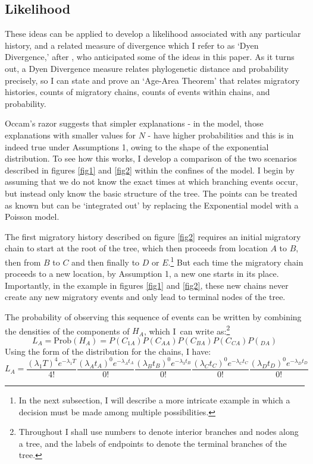 \documentclass[11pt]{article}
\begin{document}
\subsection{Likelihood}

These ideas can be applied to develop a likelihood associated with any particular history, and a related measure of divergence which I refer to as `Dyen Divergence,' after \cite{dyen56}, who anticipated some of the ideas in this paper. As it turns out, a Dyen Divergence measure relates phylogenetic distance and probability precisely, so I  can state and prove an `Age-Area Theorem' that relates  migratory histories, counts of migratory chains, counts of events within chains, and probability. 

Occam's razor suggests that simpler explanations - in the model, those explanations with smaller values for $N$ - have higher probabilities and this is in indeed true under Assumptions 1, owing to the shape of the exponential distribution. To see how this works,  I  develop a comparison of the two scenarios described in figures \ref{fig1} and \ref{fig2} within the confines of the model. I begin by assuming that we do not know the exact times at which branching events occur, but instead only know the basic structure of the tree. The points can be treated as known but can be `integrated out' by replacing the Exponential model with a Poisson model. 

The first migratory history described on figure \ref{fig2} requires an initial migratory chain to start at the root of the tree, which then proceeds from location $A$ to $B$, then from $B$ to $C$ and then finally to $D$ or $E$.\footnote{In the next subsection, I will describe a more intricate example in which a decision must be made among multiple possibilities.} But each time the migratory chain proceeds to a new location, by Assumption 1, a new one starts in its place. Importantly, in the example in figures \ref{fig1} and \ref{fig2}, these new chains never create any new migratory events and only lead to terminal nodes of the tree. 

The probability of observing this sequence of events can be written by combining the densities of the components of  $H_A$, which I\ can write as:\footnote{Throughout I shall use numbers to denote interior branches and nodes along a tree, and the labels of endpoints to denote the terminal branches of the tree.}
\begin{equation*}
L_A=\textrm{Prob}(H_A)=P(C_{1A})P(C_{AA})P(C_{BA})P(C_{CA})P(_{DA})
\end{equation*}
Using the form of the distribution for the chains, I have:
\begin{equation} \label{e1}
L_A = \frac{(\lambda_1 T)^4e^{-\lambda_1T}}{4!}
\frac{(\lambda_A t_A)^0e^{-\lambda_At_A}} {0!}\frac{(\lambda_B t_B)^0e^{-\lambda_3t_B}}{0!}\frac{(\lambda_C t_C)^0e^{-\lambda_Ct_C}}{0!}\frac{(\lambda_D t_D)^0e^{-\lambda_Dt_D}}{0!}
\end{equation} 
\end{document}
